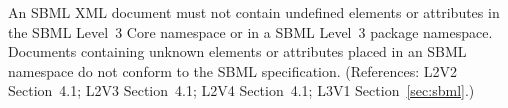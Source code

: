 An SBML XML document must not contain undefined elements or attributes in
the SBML Level~3 Core namespace or in a SBML Level~3 package namespace.
Documents containing unknown elements or attributes placed in an SBML
namespace do not conform to the SBML specification.  (References: L2V2
Section~4.1; L2V3 Section~4.1; L2V4 Section~4.1; L3V1
Section~\ref{sec:sbml}.)
